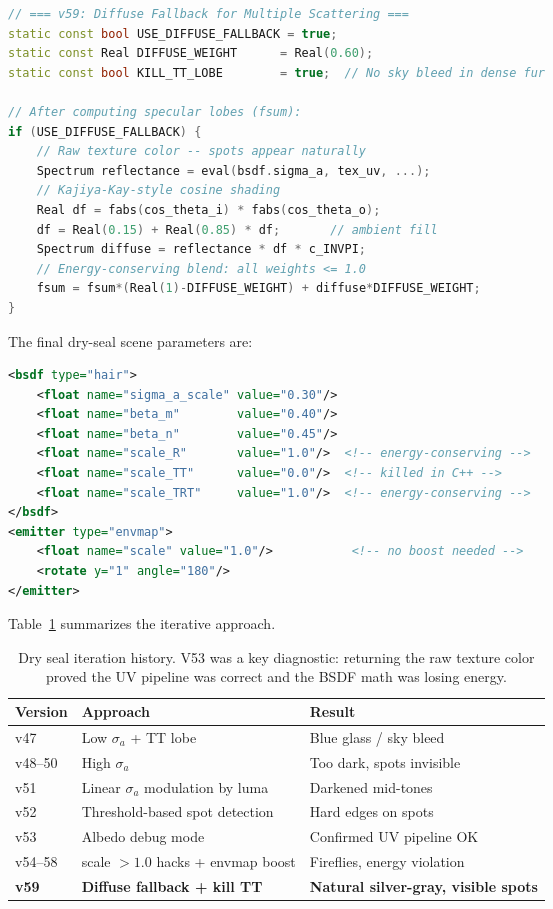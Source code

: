 \documentclass[11pt]{article}
\begin{document}
\begin{lstlisting}[language=C++]
// === v59: Diffuse Fallback for Multiple Scattering ===
static const bool USE_DIFFUSE_FALLBACK = true;
static const Real DIFFUSE_WEIGHT      = Real(0.60);
static const bool KILL_TT_LOBE        = true;  // No sky bleed in dense fur

// After computing specular lobes (fsum):
if (USE_DIFFUSE_FALLBACK) {
    // Raw texture color -- spots appear naturally
    Spectrum reflectance = eval(bsdf.sigma_a, tex_uv, ...);
    // Kajiya-Kay-style cosine shading
    Real df = fabs(cos_theta_i) * fabs(cos_theta_o);
    df = Real(0.15) + Real(0.85) * df;       // ambient fill
    Spectrum diffuse = reflectance * df * c_INVPI;
    // Energy-conserving blend: all weights <= 1.0
    fsum = fsum*(Real(1)-DIFFUSE_WEIGHT) + diffuse*DIFFUSE_WEIGHT;
}
\end{lstlisting}

The final dry-seal scene parameters are:
\begin{lstlisting}[language=XML]
<bsdf type="hair">
    <float name="sigma_a_scale" value="0.30"/>
    <float name="beta_m"        value="0.40"/>
    <float name="beta_n"        value="0.45"/>
    <float name="scale_R"       value="1.0"/>  <!-- energy-conserving -->
    <float name="scale_TT"      value="0.0"/>  <!-- killed in C++ -->
    <float name="scale_TRT"     value="1.0"/>  <!-- energy-conserving -->
</bsdf>
<emitter type="envmap">
    <float name="scale" value="1.0"/>           <!-- no boost needed -->
    <rotate y="1" angle="180"/>
</emitter>
\end{lstlisting}

Table~\ref{tab:dry_history} summarizes the iterative approach.

\begin{table}[H]
\centering
\begin{tabular}{lll}
\toprule
\textbf{Version} & \textbf{Approach} & \textbf{Result} \\
\midrule
v47      & Low $\sigma_a$ + TT lobe              & Blue glass / sky bleed \\
v48--50  & High $\sigma_a$                       & Too dark, spots invisible \\
v51      & Linear $\sigma_a$ modulation by luma  & Darkened mid-tones \\
v52      & Threshold-based spot detection        & Hard edges on spots \\
v53      & Albedo debug mode                     & Confirmed UV pipeline OK \\
v54--58  & scale $> 1.0$ hacks + envmap boost    & Fireflies, energy violation \\
\textbf{v59} & \textbf{Diffuse fallback + kill TT} & \textbf{Natural silver-gray, visible spots} \\
\bottomrule
\end{tabular}
\caption{Dry seal iteration history. V53 was a key diagnostic: returning the raw texture color proved the UV pipeline was correct and the BSDF math was losing energy.}
\label{tab:dry_history}
\end{table}
\end{document}
